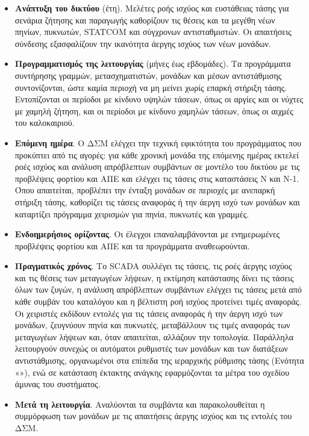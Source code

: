 \begin{itemize}
\item \textbf{Ανάπτυξη του δικτύου} (έτη). Μελέτες ροής ισχύος και ευστάθειας τάσης για
      σενάρια ζήτησης και παραγωγής καθορίζουν τις θέσεις και τα μεγέθη νέων πηνίων, πυκνωτών,
      STATCOM και σύγχρονων αντισταθμιστών. Οι απαιτήσεις σύνδεσης εξασφαλίζουν την ικανότητα
      άεργης ισχύος των νέων μονάδων.
\item \textbf{Προγραμματισμός της λειτουργίας} (μήνες έως εβδομάδες). Τα προγράμματα
      συντήρησης γραμμών, μετασχηματιστών, μονάδων και μέσων αντιστάθμισης συντονίζονται,
      ώστε καμία περιοχή να μη μείνει χωρίς επαρκή στήριξη τάσης. Εντοπίζονται οι περίοδοι με
      κίνδυνο υψηλών τάσεων, όπως οι αργίες και οι νύχτες με χαμηλή ζήτηση, και οι περίοδοι με
      κίνδυνο χαμηλών τάσεων, όπως οι αιχμές του καλοκαιριού.
\item \textbf{Επόμενη ημέρα}. Ο ΔΣΜ ελέγχει την τεχνική εφικτότητα του προγράμματος που
      προκύπτει από τις αγορές: για κάθε χρονική μονάδα της επόμενης ημέρας εκτελεί ροές
      ισχύος και ανάλυση απρόβλεπτων συμβάντων σε μοντέλο του δικτύου με τις προβλέψεις φορτίου
      και ΑΠΕ και ελέγχει τις τάσεις στις καταστάσεις N και N-1. Όπου απαιτείται, προβλέπει την
      ένταξη μονάδων σε περιοχές με ανεπαρκή στήριξη τάσης, καθορίζει τις τάσεις αναφοράς ή την
      άεργη ισχύ των μονάδων και καταρτίζει πρόγραμμα χειρισμών για πηνία, πυκνωτές και
      γραμμές.
\item \textbf{Ενδοημερήσιος ορίζοντας}. Οι έλεγχοι επαναλαμβάνονται με ενημερωμένες
      προβλέψεις φορτίου και ΑΠΕ και τα προγράμματα αναθεωρούνται.
\item \textbf{Πραγματικός χρόνος}. Το SCADA συλλέγει τις τάσεις, τις ροές άεργης ισχύος και τις
      θέσεις των μεταγωγέων λήψεων, η εκτίμηση κατάστασης δίνει τις τάσεις όλων των ζυγών, η
      ανάλυση απρόβλεπτων συμβάντων ελέγχει τις τάσεις μετά από κάθε συμβάν του καταλόγου και
      η βέλτιστη ροή ισχύος προτείνει τιμές αναφοράς. Οι χειριστές εκδίδουν εντολές για τις
      τάσεις αναφοράς ή την άεργη ισχύ των μονάδων, ζευγνύουν πηνία και πυκνωτές, μεταβάλλουν
      τις τιμές αναφοράς των μεταγωγέων λήψεων και, όταν απαιτείται, αλλάζουν την τοπολογία.
      Παράλληλα λειτουργούν συνεχώς οι αυτόματοι ρυθμιστές των μονάδων και των διατάξεων
      αντιστάθμισης, οργανωμένοι στα επίπεδα της ιεραρχικής ρύθμισης τάσης (Ενότητα
      «»), ενώ σε κατάσταση έκτακτης ανάγκης εφαρμόζονται τα μέτρα του
      σχεδίου άμυνας του συστήματος.
\item \textbf{Μετά τη λειτουργία}. Αναλύονται τα συμβάντα και παρακολουθείται η συμμόρφωση των
      μονάδων με τις απαιτήσεις άεργης ισχύος και τις εντολές του ΔΣΜ.
\end{itemize}

